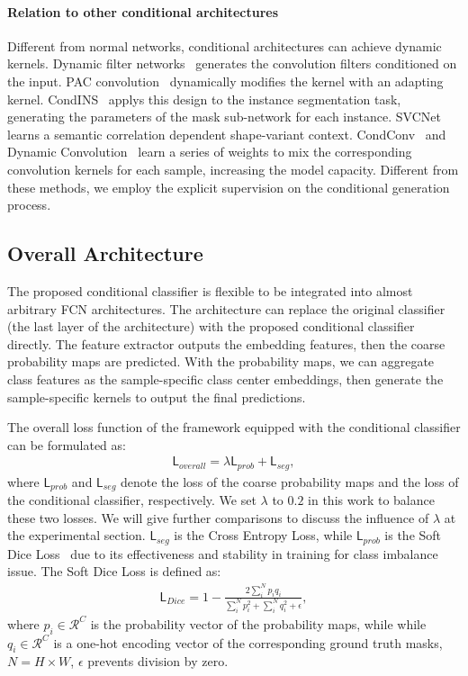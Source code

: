 \documentclass[journal]{IEEEtran}
\begin{document}
\paragraph{Relation to other conditional architectures}
Different from normal networks,
conditional architectures can achieve 
dynamic kernels.
Dynamic filter networks~\cite{Xu-NIPS-DFN-2016} 
generates the convolution filters 
conditioned on the input.
PAC convolution~\cite{Su-CVPR-PAC-2019}
dynamically modifies the kernel with
an adapting kernel.
CondINS~\cite{Tian-ECCV-CondINS-2020} applys this design to the instance segmentation task,
generating the parameters of the mask sub-network
for each instance.
SVCNet\cite{Ding-CVPR-SVCNet-2019} 
learns a semantic correlation
dependent shape-variant context.
CondConv~\cite{Yang-NIPS-CondConv-2019} and Dynamic Convolution~\cite{Chen-CVPR-DynamicConv-2020}
learn a series of weights 
to mix the corresponding convolution kernels 
for each sample, increasing the model capacity.
Different from these methods,
we employ the explicit supervision 
on the
conditional generation process.

\subsection{Overall Architecture}
The proposed conditional classifier is flexible
to be integrated into almost arbitrary FCN architectures.
The architecture can replace the original classifier 
(the last layer of the architecture)
with the proposed conditional classifier directly.
The feature extractor outputs the embedding features,
then the coarse probability maps are predicted.
With the probability maps,
we can aggregate class features as the sample-specific class center embeddings,
then generate the sample-specific kernels 
to output the final predictions.

The overall loss function of the framework equipped with 
the conditional classifier can be formulated as:
\begin{align}
	\mathsf{L}_{overall} = \lambda \mathsf{L}_{prob} + \mathsf{L}_{seg},
\end{align}
where $\mathsf{L}_{prob}$ and $\mathsf{L}_{seg}$ denote
the loss of the coarse probability maps
and the loss of the conditional classifier, respectively.
We set $\lambda$ to $0.2$ in this work to balance these two losses.
We will give further comparisons
to discuss the influence of $\lambda$
at the experimental section.
$\mathsf{L}_{seg}$ is the Cross Entropy Loss, 
while $\mathsf{L}_{prob}$ is the Soft Dice Loss~\cite{Milletari-3DV-VNet-2016}
due to its effectiveness and stability in training
for class imbalance issue.
The Soft Dice Loss is defined as:
\begin{align}
	\mathsf{L}_{Dice} = 1 - \frac{2\sum_i^N{p_i q_i}}{\sum_i^{N}p_i^2 + \sum_i^{N}q_i^2 + \epsilon},
\end{align}
where $p_i\in \mathcal{R}^{C}$ is the probability vector of the probability maps, 
while while $q_i\in \mathcal{R}^{C}$ is a one-hot encoding vector of the corresponding ground truth masks, $N = H \times W$, $\epsilon$ prevents division by zero.
\end{document}
